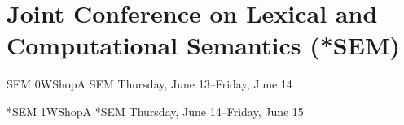 \chapter{Joint Conference on Lexical and Computational Semantics (*SEM)}
\thispagestyle{emptyheader}

\cleardoublepage

\clearpage


\clearpage
\begin{wsschedule}
{\*SEM}
{0}{WShopA}
{\*SEM}
{Thursday, June 13--Friday, June 14}{\WShopLocA}

\end{wsschedule}

\clearpage
\begin{wsschedule}
{*SEM}
{1}{WShopA}
{*SEM}
{Thursday, June 14--Friday, June 15}{\WShopLocA}

\end{wsschedule}

